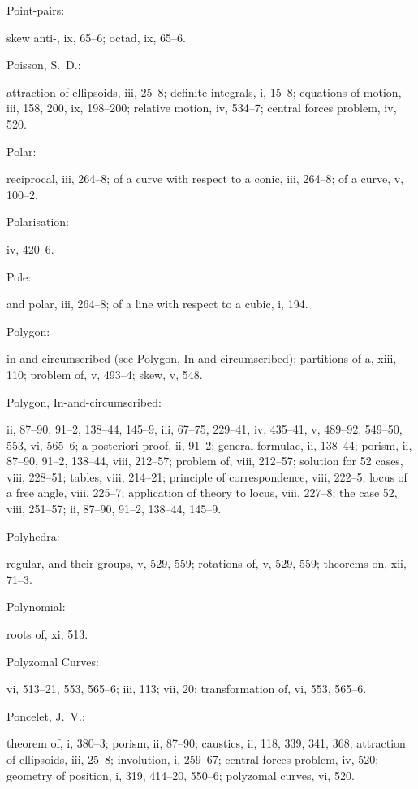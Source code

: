 \documentclass[11pt,a4paper]{book}
\providecommand{\V}[1]{#1}
\providecommand{\IndexEntry}[2]{#1\dotfill #2\par}
\begin{document}
\IndexEntry{Point-pairs}: skew anti-, \V{ix}, 65--6; octad, \V{ix}, 65--6.

\IndexEntry{Poisson, S.\ D.}: attraction of ellipsoids, \V{iii}, 25--8; definite integrals, \V{i}, 15--8; equations of motion, \V{iii}, 158, 200, \V{ix}, 198--200; relative motion, \V{iv}, 534--7; central forces problem, \V{iv}, 520.

\IndexEntry{Polar}: reciprocal, \V{iii}, 264--8; of a curve with respect to a conic, \V{iii}, 264--8; of a curve, \V{v}, 100--2.

\IndexEntry{Polarisation}: \V{iv}, 420--6.

\IndexEntry{Pole}: and polar, \V{iii}, 264--8; of a line with respect to a cubic, \V{i}, 194.

\IndexEntry{Polygon}: in-and-circumscribed (see Polygon, In-and-circumscribed); partitions of a, \V{xiii}, 110; problem of, \V{v}, 493--4; skew, \V{v}, 548.

\IndexEntry{Polygon, In-and-circumscribed}: \V{ii}, 87--90, 91--2, 138--44, 145--9, \V{iii}, 67--75, 229--41, \V{iv}, 435--41, \V{v}, 489--92, 549--50, 553, \V{vi}, 565--6; a posteriori proof, \V{ii}, 91--2; general formulae, \V{ii}, 138--44; porism, \V{ii}, 87--90, 91--2, 138--44, \V{viii}, 212--57; problem of, \V{viii}, 212--57; solution for 52 cases, \V{viii}, 228--51; tables, \V{viii}, 214--21; principle of correspondence, \V{viii}, 222--5; locus of a free angle, \V{viii}, 225--7; application of theory to locus, \V{viii}, 227--8; the case 52, \V{viii}, 251--57; \V{ii}, 87--90, 91--2, 138--44, 145--9.

\IndexEntry{Polyhedra}: regular, and their groups, \V{v}, 529, 559; rotations of, \V{v}, 529, 559; theorems on, \V{xii}, 71--3.

\IndexEntry{Polynomial}: roots of, \V{xi}, 513.

\newpage

\setcounter{page}{118}

\IndexEntry{Polyzomal Curves}: \V{vi}, 513--21, 553, 565--6; \V{iii}, 113; \V{vii}, 20; transformation of, \V{vi}, 553, 565--6.

\IndexEntry{Poncelet, J.\ V.}: theorem of, \V{i}, 380--3; porism, \V{ii}, 87--90; caustics, \V{ii}, 118, 339, 341, 368; attraction of ellipsoids, \V{iii}, 25--8; involution, \V{i}, 259--67; central forces problem, \V{iv}, 520; geometry of position, \V{i}, 319, 414--20, 550--6; polyzomal curves, \V{vi}, 520.
\end{document}
